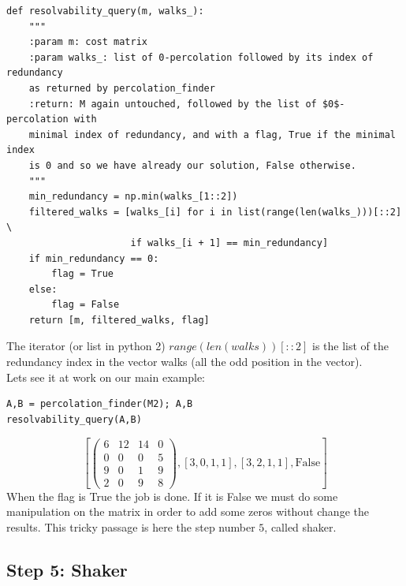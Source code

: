 \documentclass[12pt]{ClasseMatematicamente}
\begin{document}
\begin{small}
\begin{lstlisting}
def resolvability_query(m, walks_):
	"""
	:param m: cost matrix
	:param walks_: list of 0-percolation followed by its index of redundancy
	as returned by percolation_finder
	:return: M again untouched, followed by the list of $0$-percolation with
	minimal index of redundancy, and with a flag, True if the minimal index
	is 0 and so we have already our solution, False otherwise.
	"""
	min_redundancy = np.min(walks_[1::2])
	filtered_walks = [walks_[i] for i in list(range(len(walks_)))[::2] \
			          if walks_[i + 1] == min_redundancy]
	if min_redundancy == 0:
		flag = True
	else:
		flag = False
	return [m, filtered_walks, flag]

\end{lstlisting}
\end{small}

The iterator (or list in python 2) $range(len(walks))[::2]$ is the list of the redundancy index in the vector walks (all the odd position in the vector).\\
Lets see it at work on our main example:
\begin{small}
 \begin{lstlisting}
A,B = percolation_finder(M2); A,B
resolvability_query(A,B)
\end{lstlisting}
\end{small}
\begin{equation}\label{matrix_M4}
\left[\left(\begin{array}{rrrr}
6 & 12 & 14 & 0 \\
0 & 0 & 0 & 5 \\
9 & 0 & 1 & 9 \\
2 & 0 & 9 & 8
\end{array}\right), \left[3, 0, 1, 1\right], \left[3, 2, 1, 1\right],
\mathrm{False}\right]
\end{equation}
When the flag is True the job is done. If it is False we must do some manipulation on the matrix in order to add some zeros without change the results. This tricky passage is here the step number $5$, called shaker.

\subsection*{Step 5: Shaker}
\end{document}
